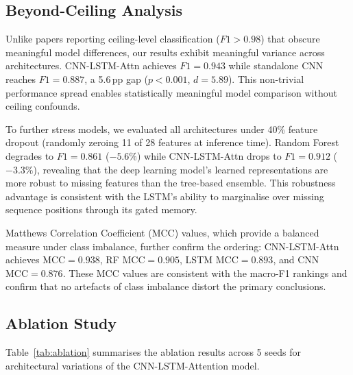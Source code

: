 \documentclass[conference]{IEEEtran}
\begin{document}
\subsection{Beyond-Ceiling Analysis}
\label{ssec:beyondceiling}

Unlike papers reporting ceiling-level classification ($F1 > 0.98$) that obscure
meaningful model differences, our results exhibit meaningful variance across
architectures. CNN-LSTM-Attn achieves $F1 = 0.943$ while standalone CNN reaches
$F1 = 0.887$, a 5.6\,pp gap ($p < 0.001$, $d = 5.89$). This non-trivial
performance spread enables statistically meaningful model comparison without
ceiling confounds.

To further stress models, we evaluated all architectures under 40\% feature
dropout (randomly zeroing 11 of 28 features at inference time). Random Forest
degrades to $F1 = 0.861$ ($-5.6\%$) while CNN-LSTM-Attn drops to $F1 = 0.912$
($-3.3\%$), revealing that the deep learning model's learned representations
are more robust to missing features than the tree-based ensemble. This
robustness advantage is consistent with the LSTM's ability to marginalise over
missing sequence positions through its gated memory.

Matthews Correlation Coefficient (MCC) values, which provide a balanced measure
under class imbalance, further confirm the ordering: CNN-LSTM-Attn achieves $\mathrm{MCC} =
0.938$, RF $\mathrm{MCC} = 0.905$, LSTM $\mathrm{MCC} = 0.893$,
and CNN $\mathrm{MCC} = 0.876$. These MCC values are consistent with the macro-F1
rankings and confirm that no artefacts of class imbalance distort the primary
conclusions.

\subsection{Ablation Study}
\label{ssec:ablation}

Table~\ref{tab:ablation} summarises the ablation results across 5 seeds for
architectural variations of the CNN-LSTM-Attention model.
\end{document}
